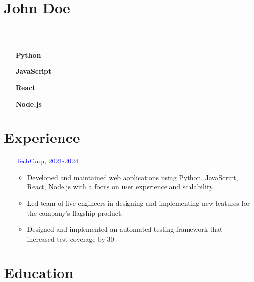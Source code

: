 \documentclass[11pt, oneside]{article}
\begin{document}
\onehalfspacing
\thispagestyle{empty}
\setlength{\unitsep}{10pt}
\setlength{\unitskip}{16pt}
\setlength{\parindent}{0cm}
\setlength{\parskip}{0.5cm plus 0.2cm}

\section*{\Large \textbf{John Doe}}

\begin{center}
\colorbox{mygreen}{
\parbox[c][1em]{25em}{%
\centering
\sffamily
\textcolor{white}{Software Engineer}
}}\end{center}

\noindent\rule{\textwidth}{0.4pt}\vspace*{6pt}

\begin{itemize}[leftmargin=*]
    \item[\textcolor{mygreen}{\bfseries Python}]
    \item[\textcolor{mygreen}{\bfseries JavaScript}]
    \item[\textcolor{mygreen}{\bfseries React}]
    \item[\textcolor{mygreen}{\bfseries Node.js}]
\end{itemize}
\vspace*{14pt}

\section*{\Large \textbf{Experience}}

\begin{itemize}[leftmargin=0cm]
    \item[\textcolor{blue}{TechCorp, 2021-2024}]
        \begin{itemize}[leftmargin=*]
            \item Developed and maintained web applications using Python, JavaScript, React, Node.js with a focus on user experience and scalability.
            \item Led team of five engineers in designing and implementing new features for the company's flagship product.
            \item Designed and implemented an automated testing framework that increased test coverage by 30%
        \end{itemize}
\end{itemize}

\section*{\Large \textbf{Education}}
\end{document}
